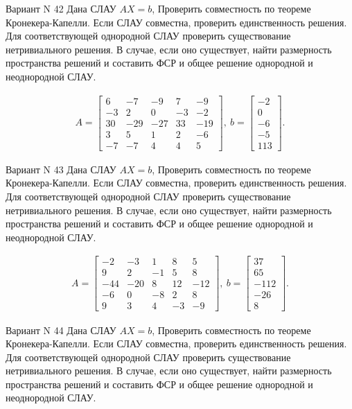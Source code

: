 \documentclass[11pt]{report}
\begin{document}
Вариант N 42
Дана СЛАУ $AX = b$,
Проверить совместность по теореме Кронекера-Капелли. Если СЛАУ совместна, проверить единственность решения.
Для соответствующей однородной СЛАУ проверить существование нетривиального решения. В случае, если оно существует,
найти размерность пространства решений и составить ФСР и общее решение однородной  и неоднородной СЛАУ.


\begin{align*}
 A = \left[\begin{matrix}6 & -7 & -9 & 7 & -9\\-3 & 2 & 0 & -3 & -2\\30 & -29 & -27 & 33 & -19\\3 & 5 & 1 & 2 & -6\\-7 & -7 & 4 & 4 & 5\end{matrix}\right],
\ b = \left[\begin{matrix}-2\\0\\-6\\-5\\113\end{matrix}\right]. 
 \end{align*}

Вариант N 43
Дана СЛАУ $AX = b$,
Проверить совместность по теореме Кронекера-Капелли. Если СЛАУ совместна, проверить единственность решения.
Для соответствующей однородной СЛАУ проверить существование нетривиального решения. В случае, если оно существует,
найти размерность пространства решений и составить ФСР и общее решение однородной  и неоднородной СЛАУ.


\begin{align*}
 A = \left[\begin{matrix}-2 & -3 & 1 & 8 & 5\\9 & 2 & -1 & 5 & 8\\-44 & -20 & 8 & 12 & -12\\-6 & 0 & -8 & 2 & 8\\9 & 3 & 4 & -3 & -9\end{matrix}\right],
\ b = \left[\begin{matrix}37\\65\\-112\\-26\\8\end{matrix}\right]. 
 \end{align*}

Вариант N 44
Дана СЛАУ $AX = b$,
Проверить совместность по теореме Кронекера-Капелли. Если СЛАУ совместна, проверить единственность решения.
Для соответствующей однородной СЛАУ проверить существование нетривиального решения. В случае, если оно существует,
найти размерность пространства решений и составить ФСР и общее решение однородной  и неоднородной СЛАУ.
\end{document}

